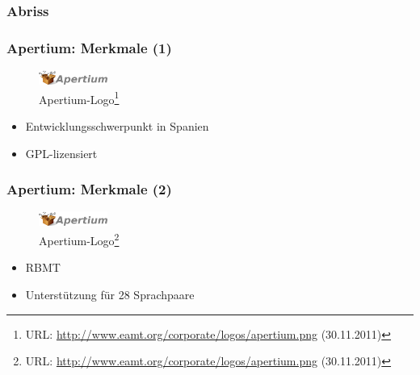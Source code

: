 \documentclass{beamer}
\begin{document}
\subsubsection{Abriss}
\begin{frame}
\frametitle{Apertium: Merkmale (1)}
\begin{figure}
  \includegraphics[width=0.20\textwidth]{graphics/apertiumlogo}
  \caption{Apertium-Logo\footnote{URL: \url{http://www.eamt.org/corporate/logos/apertium.png} (30.11.2011)}}
  \end{figure}
\begin{itemize}
\item Entwicklungsschwerpunkt in Spanien
\item GPL-lizensiert
\end{itemize}
\end{frame}
\begin{frame}
\frametitle{Apertium: Merkmale (2)}
\begin{figure}
  \includegraphics[width=0.20\textwidth]{graphics/apertiumlogo}
  \caption{Apertium-Logo\footnote{URL: \url{http://www.eamt.org/corporate/logos/apertium.png} (30.11.2011)}}
  \end{figure}
\begin{itemize}
\item RBMT
\item Unterstützung für 28 Sprachpaare
\end{itemize}
\end{frame}
\end{document}

